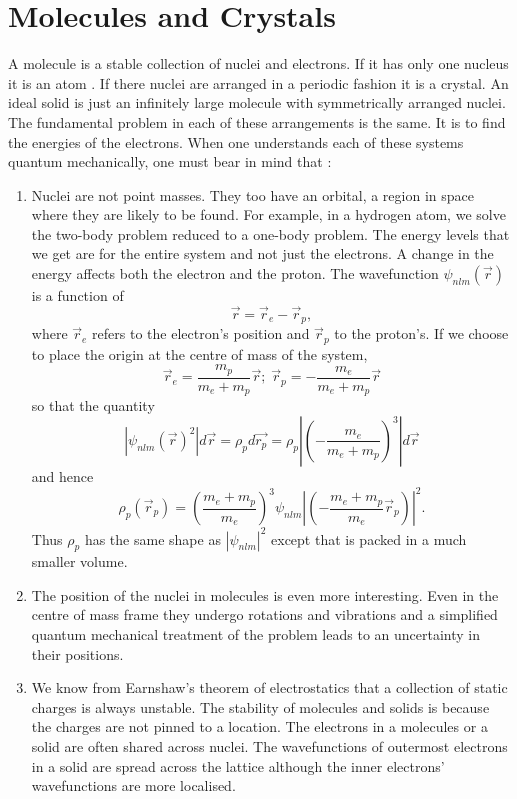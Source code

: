 \section{Molecules and Crystals}\label{c2s3}
A molecule is a stable collection of nuclei and electrons. If it has only one
nucleus it is an atom \cite{barbatti2023empty}. If there nuclei are arranged in
a periodic fashion it is a crystal. An ideal solid is just an infinitely large 
molecule with symmetrically arranged nuclei. The fundamental problem in each of
these arrangements is the same. It is to find the energies of the electrons. 
When one understands each of these systems quantum mechanically, one must bear 
in mind that \cite{barbatti2023empty}:
\begin{enumerate}
\item Nuclei are not point masses. They too have an orbital, a region in space
where they are likely to be found. For example, in a hydrogen atom, we solve 
the two-body problem reduced to a one-body problem. The energy levels that we 
get are for the entire system and not just the electrons. A change in the 
energy affects both the electron and the proton. The wavefunction 
$\psi_{nlm}(\vec{r})$ is a function of
\begin{equation}\label{c2e35}
\vec{r} = \vec{r}_e - \vec{r}_p,
\end{equation}
where $\vec{r}_e$ refers to the electron's position and $\vec{r}_p$ to the 
proton's. If we choose to place the origin at the centre of mass of the system,
\[
\vec{r}_e = \frac{m_p}{m_e + m_p}\vec{r};\; \vec{r}_p = -\frac{m_e}{m_e + m_p}
\vec{r}
\]
so that the quantity
\[
|\psi_{nlm}(\vec{r})^2|d\vec{r} = \rho_p d\vec{r_p} = \rho_p\left|
\left(-\frac{m_e}{m_e + m_p}\right)^3\right|d\vec{r}
\]
and hence
\[
\rho_p(\vec{r}_p) = \left(\frac{m_e + m_p}{m_e}\right)^3\psi_{nlm}\left|
\left(-\frac{m_e + m_p}{m_e}\vec{r}_p\right)\right|^2.
\]
Thus $\rho_p$ has the same shape as $|\psi_{nlm}|^2$ except that is packed in
a much smaller volume.

\item The position of the nuclei in molecules is even more interesting. Even in
the centre of mass frame they undergo rotations and vibrations and a simplified
quantum mechanical treatment of the problem leads to an uncertainty in their
positions.

\item We know from Earnshaw's theorem of electrostatics that a collection of
static charges is always unstable. The stability of molecules and solids is
because the charges are not pinned to a location. The electrons in a molecules
or a solid are often shared across nuclei. The wavefunctions of outermost 
electrons in a solid are spread across the lattice although the inner electrons'
wavefunctions are more localised.


\end{enumerate}
